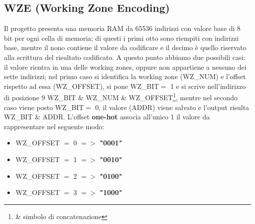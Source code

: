 \documentclass[12pt]{article}
\begin{document}
\subsection{WZE (Working Zone Encoding)}
Il progetto presenta una memoria RAM da 65536 indirizzi con valore base di 8 bit per ogni cella di memoria; di questi i primi otto sono riempiti con indirizzi base, mentre il nono contiene il valore da codificare e il decimo è quello riservato alla scrittura del risultato codificato.\newline
A questo punto abbiamo due possibili casi: il valore rientra in una delle working zones, oppure non appartiene a nessuno dei sette indirizzi; nel primo caso si identifica la working zone (WZ\_NUM) e l'offset rispetto ad essa (WZ\_OFFSET), si pone WZ\_BIT\(=\) 1 e si scrive nell'indirizzo di posizione 9 WZ\_BIT \& WZ\_NUM \& WZ\_OFFSET\footnote[1]{\& simbolo di concatenazione}, mentre nel secondo caso viene posto WZ\_BIT\(=\) 0, il valore (ADDR) viene salvato e l'output risulta WZ\_BIT \& ADDR.\newline
L'offset \textbf{one-hot} associa all'unico 1 il valore da rappresentare nel seguente modo:
\begin{itemize}
    \item WZ\_OFFSET \(=\) 0 \(=>\) \textbf{"0001"}
    \item WZ\_OFFSET \(=\) 1 \(=>\) \textbf{"0010"}
    \item WZ\_OFFSET \(=\) 2 \(=>\) \textbf{"0100"}
    \item WZ\_OFFSET \(=\) 3 \(=>\) \textbf{"1000"}
\end{itemize}
\newpage
\end{document}
